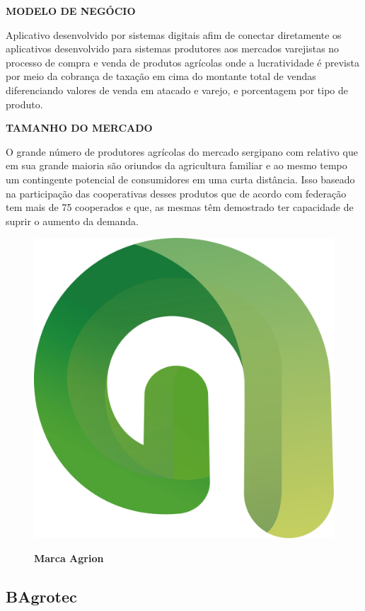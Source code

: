 \textbf{MODELO DE NEGÓCIO}

Aplicativo desenvolvido por sistemas digitais afim de conectar diretamente os aplicativos desenvolvido para sistemas produtores aos mercados varejistas no processo de compra e venda de produtos agrícolas onde a lucratividade é prevista por meio da cobrança de taxação em cima do montante total de vendas diferenciando valores de venda em atacado e varejo, e porcentagem por tipo de produto.

\textbf{TAMANHO DO MERCADO}

O grande número de produtores agrícolas  do mercado sergipano com relativo que  em sua grande maioria são oriundos da agricultura familiar e ao mesmo tempo um contingente potencial de consumidores em uma curta distância. Isso baseado na  participação das cooperativas desses produtos que de acordo 
com federação tem mais de 75 cooperados e que, as mesmas têm demostrado ter capacidade de suprir o aumento da demanda.


\begin{figure}[!htb]
\centering
\caption{\textbf{Marca Agrion}}
\includegraphics[scale=0.2]{Imagens/agrion.png}
\label{figura_14}
\end{figure}
\newpage

\subsection{BAgrotec}

